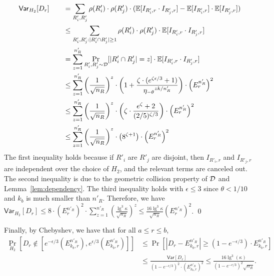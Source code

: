\begin{align*}
\mathsf{Var}_{H_2}[D_r] &\quad \quad =  \sum_{R'_i, R'_j}
\rho(R'_i) \cdot \rho(R'_j) \cdot ( \mathbb{E}[I_{R'_i, r } \cdot I_{R'_j, r}
] - \mathbb{E}[I_{R'_i, r }] \cdot \mathbb{E}[I_{R'_j, r}] ) \\
&\quad \quad \leq  \sum_{R'_i, R'_j : |R'_i \cap R'_j| \ge 1} \rho(R'_i) \cdot \rho(R'_j) \cdot \mathbb{E}[I_{R'_i,r} \cdot I_{R'_j, r}]\\ 
&\quad \quad =  \sum_{z=1}^{n'_R}
\Pr_{R'_i, R'_j \sim {\cal D}} [|R'_i \cap R'_j| = z]
\cdot \mathbb{E}[I_{R'_i,r} \cdot I_{R'_j, r}] \\
&\quad \quad \le \sum_{z=1}^{n'_R} \left(\frac{1}{\sqrt{n_R}}\right)^z \cdot 
\left(  1  + \frac{\zeta \cdot (e^{\zeta \epsilon/3} + 1)}{{\eta_{-\theta}}^{
z k/n'_R} } \right) \cdot \left(E^{n'_R}_r\right)^2  \\
&\quad \quad \le \sum_{z=1}^{n'_R} \left(\frac{1}{\sqrt{n_R}}\right)^z \cdot 
\left(  \zeta \cdot \frac{e^\zeta + 2}{(2/5)^{\zeta/3} } \right) \cdot \left(E^{n'_R}_r\right)^2  \\
&\quad \quad \le \sum_{z=1}^{n'_R} \left(\frac{1}{\sqrt{n_R}}\right)^z \cdot 
\left(  8^{\zeta+1} \right) \cdot \left(E^{n'_R}_r\right)^2  \\
\end{align*}
The first inequality holds because if $R'_i$ are $R'_j$ are disjoint, then $I_{R'_i,r}$ and $I_{R'_j, r}$ are independent over the choice of $H_2$, and the relevant terms are canceled out. The second inequality is due to the geometric collision property of ${\cal D}$ and Lemma~\ref{lem:dependency}. The third inequality holds with $\epsilon\leq 3$ since $\theta < 1/10$ and $k_b$ is much smaller than $n'_R$. 
%
Therefore, we have $\mathsf{Var}_{H_2}[D_r] \le 
8 \cdot \left(E^{n'_R}_r\right)^2 \cdot \sum_{z=1}^{n'_R} \left(
 \frac{\lg^3\kappa }{\sqrt{n_R}} \right)^z  \leq \frac{16 \lg^3 \kappa}{\sqrt{n_R}} {\left (E^{n'_R}_{r} \right )}^2$. 
\qed

Finally, by Chebyshev, we have that for all $a \leq r \leq b$,
\begin{align*} \label{eq:chebyshev}
\Pr_{H_2}\left [D_r \notin [e^{-\epsilon/3} (E^{n'_R}_{k_b, r}), e^{\epsilon/3} (E^{n'_R}_{k_b, r})]  \right ] & \leq \Pr\left [|D_r -E^{n'_R}_{k_b, r}| \geq  (1-e^{-\epsilon/3}) \cdot E^{n'_R}_{k_b, r} \right ] \\
& \leq  \frac{\mathsf{Var}[D_r]}{(1-e^{-\epsilon/3})^{2} \cdot (E^{n'_R}_{k_b, r})^2} 
\leq  \frac{16 \lg^3(\kappa)}{(1-e^{-\epsilon/3})^{2}\sqrt{n_R}}. 
\end{align*}




